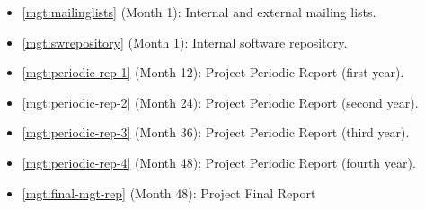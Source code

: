 \begin{Workpackage}{\thewpno}
\begin{WPDescription}
\end{WPDescription}

\begin{WPDeliverables}
\begin{itemize}
\item
\ref{mgt:mailinglists}
(Month 1): 
Internal and external mailing lists.
\item
\ref{mgt:swrepository}
(Month 1): 
Internal software repository.
\item
\ref{mgt:periodic-rep-1}
(Month 12): 
Project Periodic Report (first year).
\item
\ref{mgt:periodic-rep-2}
 (Month 24): 
Project Periodic Report (second year).
\item
\ref{mgt:periodic-rep-3}
(Month 36): 
Project Periodic Report (third year).
\item
\ref{mgt:periodic-rep-4}
(Month 48): 
Project Periodic Report (fourth year).
\item
\ref{mgt:final-mgt-rep}
(Month 48): 
Project Final Report
\end{itemize}
\end{WPDeliverables}
\end{Workpackage}

